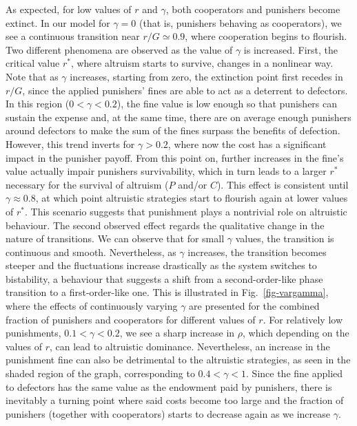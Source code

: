 \documentclass[5p]{elsarticle}
\begin{document}
As expected, for low values of $r$ and $ \gamma $, both cooperators and punishers become extinct. In our model for $\gamma=0$ (that is, punishers behaving as cooperators), we see a continuous transition near $r/G\simeq0.9$, where cooperation begins to flourish. 
%
Two different phenomena are observed as the value of $\gamma$ is increased. First, the critical value $r^{*}$, where altruism starts to survive, changes in a nonlinear way. Note that as $\gamma$ increases, starting from zero, the extinction point first recedes in $r/G$, since the applied punishers' fines are able to act as a deterrent to defectors. In this region ($0<\gamma<0.2$), the fine value is low enough so that punishers can sustain the expense and,  at the same time, there are on average enough punishers around defectors to make the sum of the fines surpass the benefits of defection. 
%
However, this trend inverts for $\gamma>0.2${, where now the cost has a significant impact in the punisher payoff. From this point on,} further increases in the fine's value actually { impair punishers survivability, which in turn leads} to a larger $r^*$ necessary for the survival of altruism ($P$ and/or $C$). This effect is consistent until $\gamma \approx 0.8$, at which point altruistic strategies start to flourish again at lower values of $r^*$. This scenario suggests that punishment plays a nontrivial role on altruistic behaviour.
%
The second observed effect regards the qualitative change in the nature of transitions. We can observe that for small $\gamma$ values, the transition is continuous and smooth. Nevertheless, as $\gamma$ increases, the transition becomes steeper and the fluctuations increase drastically as the system switches to bistability, a behaviour that suggests a shift from a second-order-like phase transition to a first-order-like one. This is illustrated in Fig.~\ref{fig-vargamma}, where the effects of continuously varying $\gamma$ are presented for the combined fraction of punishers and cooperators for different values of $r$.
%
For relatively low punishments, $0.1<\gamma<0.2$, we see a sharp increase in $\rho$, which depending on the values of $r$, can lead to altruistic dominance.
%
Nevertheless, an increase in the punishment fine can also be detrimental to the altruistic strategies, as seen in the shaded region of the graph, corresponding to $0.4<\gamma<1$. Since the fine applied to defectors has the same value as the endowment paid by punishers,  there is inevitably a turning point where said costs become too large and the fraction of punishers (together with cooperators) starts to decrease again as we increase $\gamma$. 
\end{document}
